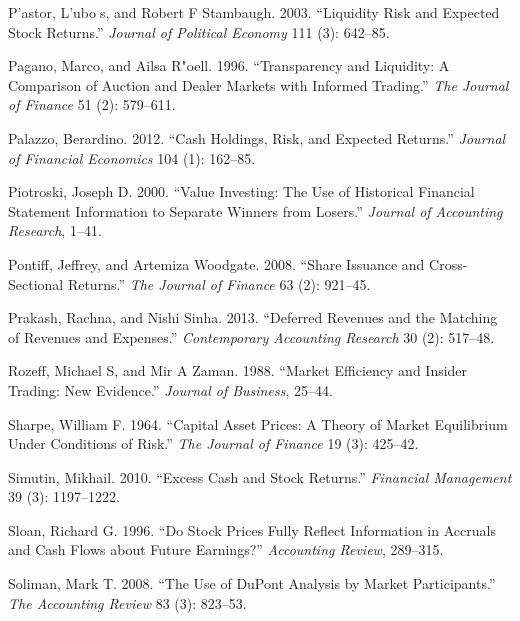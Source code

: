 \documentclass[
  letterpaper,
  DIV=11,
  numbers=noendperiod]{scrreprt}
\newlength{\cslhangindent}
\newlength{\cslentryspacingunit} %
\newenvironment{CSLReferences}[2] %
 {%
  \setlength{\parindent}{0pt}
  \ifodd #1
  \let\oldpar\par
  \def\par{\hangindent=\cslhangindent\oldpar}
  \fi
  \setlength{\parskip}{#2\cslentryspacingunit}
 }%
 {}
\begin{document}
\begin{CSLReferences}{1}{0}
\leavevmode{}%
P'astor, L'ubos, and Robert F Stambaugh. 2003. {``Liquidity Risk and
Expected Stock Returns.''} \emph{Journal of Political Economy} 111 (3):
642--85.

\leavevmode{}%
Pagano, Marco, and Ailsa R"oell. 1996. {``Transparency and Liquidity: A
Comparison of Auction and Dealer Markets with Informed Trading.''}
\emph{The Journal of Finance} 51 (2): 579--611.

\leavevmode{}%
Palazzo, Berardino. 2012. {``Cash Holdings, Risk, and Expected
Returns.''} \emph{Journal of Financial Economics} 104 (1): 162--85.

\leavevmode{}%
Piotroski, Joseph D. 2000. {``Value Investing: The Use of Historical
Financial Statement Information to Separate Winners from Losers.''}
\emph{Journal of Accounting Research}, 1--41.

\leavevmode{}%
Pontiff, Jeffrey, and Artemiza Woodgate. 2008. {``Share Issuance and
Cross-Sectional Returns.''} \emph{The Journal of Finance} 63 (2):
921--45.

\leavevmode{}%
Prakash, Rachna, and Nishi Sinha. 2013. {``Deferred Revenues and the
Matching of Revenues and Expenses.''} \emph{Contemporary Accounting
Research} 30 (2): 517--48.

\leavevmode{}%
Rozeff, Michael S, and Mir A Zaman. 1988. {``Market Efficiency and
Insider Trading: New Evidence.''} \emph{Journal of Business}, 25--44.

\leavevmode{}%
Sharpe, William F. 1964. {``Capital Asset Prices: A Theory of Market
Equilibrium Under Conditions of Risk.''} \emph{The Journal of Finance}
19 (3): 425--42.

\leavevmode{}%
Simutin, Mikhail. 2010. {``Excess Cash and Stock Returns.''}
\emph{Financial Management} 39 (3): 1197--1222.

\leavevmode{}%
Sloan, Richard G. 1996. {``Do Stock Prices Fully Reflect Information in
Accruals and Cash Flows about Future Earnings?''} \emph{Accounting
Review}, 289--315.

\leavevmode{}%
Soliman, Mark T. 2008. {``The Use of DuPont Analysis by Market
Participants.''} \emph{The Accounting Review} 83 (3): 823--53.


\end{CSLReferences}
\end{document}

